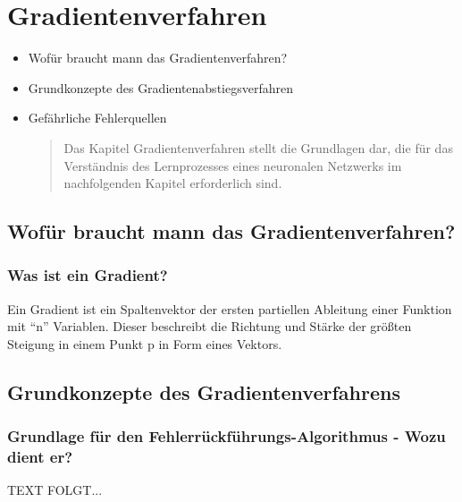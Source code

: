 \newpage
\thispagestyle{empty}
\section{Gradientenverfahren}\label{sec:gradientenverfahren}   
\begin{tcolorbox}[title={Inhalte des \textit{Gradientenverfahren}}]
  \begin{itemize}
    \item Wofür braucht mann das Gradientenverfahren?
    \item Grundkonzepte des Gradientenabstiegsverfahren
    \item Gefährliche Fehlerquellen
  \begin{quotation}
      Das Kapitel Gradientenverfahren stellt die Grundlagen dar, die für das Verständnis des Lernprozesses eines neuronalen Netzwerks im nachfolgenden Kapitel erforderlich sind.
  \end{quotation}
  \end{itemize}
\end{tcolorbox}


\subsection{Wofür braucht mann das Gradientenverfahren?}\label{subsec:gradientenverfahren:wofuer}
\subsubsection{Was ist ein Gradient?}\label{subsec:gradientenverfahren:was_ist_gradient}
  Ein Gradient ist ein Spaltenvektor der ersten partiellen Ableitung einer Funktion mit “n” Variablen.
  Dieser beschreibt die Richtung und Stärke der größten Steigung in einem Punkt p in Form eines Vektors.\cite{JH20}


\subsection{Grundkonzepte des Gradientenverfahrens}\label{subsec:gradientenverfahren:grundkonzepte}
\subsubsection{Grundlage für den Fehlerrückführungs-Algorithmus - Wozu dient er?}\label{subsec:gradientenverfahren:grundlage_fehlerrueckfuehrungsalg}
  TEXT FOLGT...


